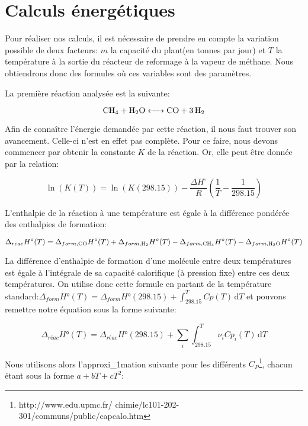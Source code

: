 \documentclass[a4paper, oneside, 12pt]{article}
\begin{document}
\section{Calculs énergétiques}

Pour réaliser nos calculs, il est nécessaire de prendre 
en compte la variation possible de 
deux facteurs: $m$ la capacité du plant(en tonnes par jour) 
et $T$ la température à la sortie du
réacteur de reformage à la vapeur de méthane.
Nous obtiendrons donc des formules où ces variables sont des paramètres.

La première réaction analysée est la suivante:

\begin{equation*}
	\ce{CH4 + H2O <-> CO + 3H2}
\end{equation*}

Afin de connaître l'énergie demandée par cette réaction,
il nous faut trouver son avancement. Celle-ci n'est en effet pas complète.
Pour ce faire, nous devons commencer par obtenir la constante $K$ 
de la réaction. Or, elle peut être donnée par la relation:

\begin{equation}
	\ln{(K(T))} = \ln{(K(298.15))} - 
	\frac{\Delta H^{\circ}}{R}(\frac{1}{T} - \frac{1}{298.15})
\end{equation}

L'enthalpie de la réaction à une température est égale 
à la différence pondérée des enthalpies de formation:

\begin{equation}
	\Delta_{reac} H^{\circ} (T)= \Delta_{form,\ce{CO}} H^{\circ}(T)
	+\Delta_{form, \ce{H2}} H^{\circ} (T) - \Delta_{form, \ce{CH4}} H^{\circ} (T) 
	-\Delta_{form, \ce{H2O}} H^{\circ} (T)
\end{equation}

La différence d'enthalpie de formation d'une molécule entre deux températures est
égale à l'intégrale de sa capacité calorifique (à pression fixe) entre ces deux températures.
On utilise donc cette formule en partant de la température standard:$\Delta_{form}H°(T)= \Delta_{form}H°(298.15)+\int_298.15^T Cp(T) \, \mathrm dT$ et pouvons remettre notre équation sous la forme suivante:

\begin{equation}
	\Delta_{réac}H°(T)=\Delta_{réac}H°(298.15)+\sum_i \int_{298.15}^T \nu_i Cp_i(T) \, \mathrm dT
\end{equation}

Nous utilisons alors l'approxi_{1}mation suivante pour les différents $C_P$\footnote{http://www.edu.upmc.fr/
chimie/lc101-202-301/communs/public/capcalo.htm}, 
chacun étant sous la forme $a+bT+cT^2$:
\end{document}
